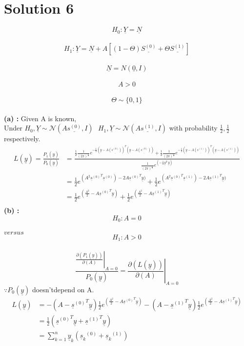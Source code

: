 \documentclass[a4paper,english,12pt]{article}
\begin{document}
\section{Solution 6}

$$H_0:\underline{Y}=\underline{N}$$\\
$$H_1:\underline{Y}=\underline{N}+A[(1-\Theta)\underline{S^{(0)}}+\Theta\underline{S^{(1)}}]$$\\
$$\underline{N}=N(\underline{0},I)$$\\
$$A>0$$\\
$$\Theta\sim\{0,1\}$$\\
\textbf{(a) : }
Given A is known,\\
Under $H_0,\underline{Y}\sim\mathcal{N}(A\underline{s^{(0)}},I)\,\,\,\,H_1,\underline{Y}\sim\mathcal{N}(A\underline{s^{(1)}},I)$ with probability $\frac{1}{2},\frac{1}{2}$ respectively.\\
\begin{align*}
L(\underline{y})=\frac{P_1\left(\underline{y}\right)}{P_0\left(\underline{y}\right)}&=\frac{\frac{1}{2}\frac{1}{(2\pi)^{\frac{n}{2}}}e^{-\frac{1}{2}\left(\underline{y}-A \underline{(s^{(0)})} \right)^T \left(\underline{y}-A \underline{(s^{(0)})} \right)} +\frac{1}{2}\frac{1}{(2\pi)^{\frac{n}{2}}}e^{-\frac{1}{2}\left(\underline{y}-A \underline{(s^{(1)})} \right)^T \left(\underline{y}-A \underline{(s^{(1)})} \right)} }{\frac{1}{(2\pi)^{\frac{n}{2}}} e^{(-\frac{1}{2}\underline{y}^T \,\underline{y})}}\\
&=\frac{1}{2}e^{(A^2 {\underline{s}^{(0)}}^T \underline{s}^{(0)})- 2 A {\underline{s}^{(0)}}^T \underline{y})} + \frac{1}{2}e^{(A^2 {\underline{s}^{(0)}}^T \underline{s}^{(1)})- 2 A {\underline{s}^{(1)}}^T \underline{y})}\\
&=\frac{1}{2} e^{\left(\frac{A^2}{2}- A {\underline{s}^{(0)}}^T \underline{y}\right)}+\frac{1}{2} e^{\left(\frac{A^2}{2}- A {\underline{s}^{(1)}}^T \underline{y}\right)}\\
\end{align*}
\textbf{(b) : }
$$H_0: A=0$$\\
$versus$\\ 
$$H_1:  A>0$$\\
$$\frac{\left.\frac{\partial(P_1(\underline{y}))}{\partial(A)}\right|_{A=0}}{P_0(\underline{y})}=\left. \frac{\partial(L(\underline{y}))}{\partial
(A)} \right|_{A=0} $$ $\because P_0(\underline{y})$ doesn'tdepend on A.\\
\begin{align*}
L(\underline{y})&=- \left(A-{\underline{s}^{(0)}}^T \underline{y}\right) \frac{1}{2} e^{\left(\frac{A^2}{2}-A{\underline{s}^{(0)}}^T \underline{y}\right)}- \left(A-{\underline{s}^{(1)}}^T \underline{y}\right) \frac{1}{2} e^{\left(\frac{A^2}{2}-A{\underline{s}^{(1)}}^T \underline{y}\right)}\\
&=\frac{1}{2}({\underline{s}^{(0)}}^T \underline{y} + {\underline{s}^{(1)}}^T \underline{y})\\
&=\sum \limits_{k=1}^{n} \underline{y}_k ({\underline{s}_k}^{(0)}+{\underline{s}_k}^{(1)})\\
\end{align*}
\end{document}
